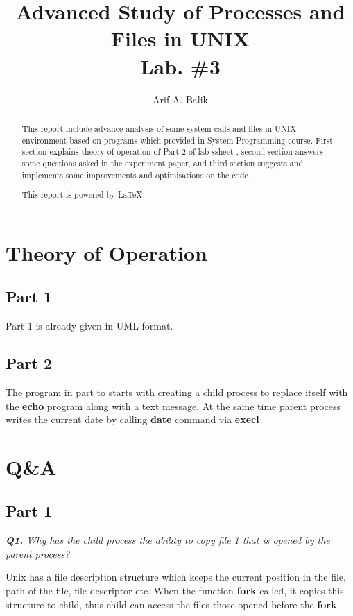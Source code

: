 \documentclass[11pt]{article}
\title{Advanced Study of Processes and Files in UNIX \\Lab. \#3}
\author{Arif A. Balik}
\affil{Undergraduate Student\\
	Sytstems Programming\\
	Department of Computer Science\\
	Arel University\\
	Büyükçekmece, İstanbul 34537\\
    Email: arifbalik@outlook.com
}
\begin{document}
\maketitle

\begin{abstract}
This report include advance analysis of some system calls and files in UNIX environment based on programs which provided in System Programming course. First section explains theory of operation of Part 2 of lab ssheet , second section answers some questions asked in the experiment paper, and third section suggests and implements some improvements and optimisations on the code.

This report is powered by \LaTeX{}
\end{abstract}

\section*{Theory of Operation}
\subsection*{Part 1}

Part 1 is already given in UML format.
\subsection*{Part 2}

The program in part to starts with creating a child process to replace itself with the \textbf{echo} program along with a text message. At the same time parent process writes the current date by calling \textbf{date} command via \textbf{execl}
\section*{Q\&A}



\subsection*{Part 1}

\vspace{3mm}
\textit{\textbf{Q1.} Why has the child process the ability to copy file 1 that is opened by the parent process?}
\vspace{3mm}

Unix has a file description structure which keeps the current position in the file, path of the file, file descriptor etc. When the function \textbf{fork} called, it copies this structure to child, thus child can access the files those opened before the \textbf{fork}
\end{document}
